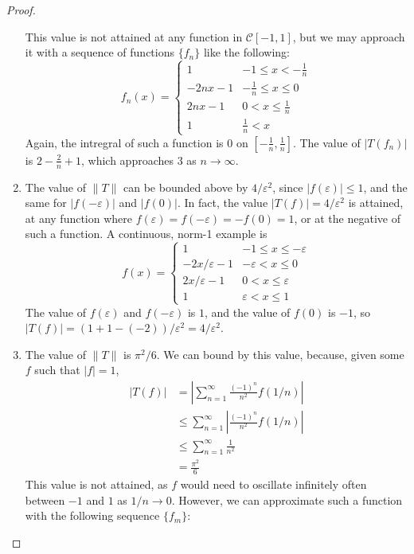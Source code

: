 \documentclass[12pt]{article}
\theoremstyle{definition}
\begin{document}
\begin{proof}
\begin{enumerate}[label=(\roman*)]
        This value is not attained at any function in $\mathcal{C}[-1,1]$, but we may approach it with a sequence of functions $\{f_n\}$ like the following:
        \[
        f_n(x) = \begin{cases}
        1 & -1 \leq x < -\frac{1}{n}\\
        -2nx -1 & -\frac{1}{n} \leq x \leq 0\\
        2nx - 1 & 0 < x \leq \frac{1}{n}\\
        1 & \frac{1}{n} < x
        \end{cases}
        \]
	Again, the intregral of such a function is $0$ on $[-\frac{1}{n}, \frac{1}{n}]$. The value of $\lvert T(f_n) \rvert$ is $2 - \frac{2}{n} + 1$, which approaches $3$ as $n \to \infty$.
        \item The value of $\lVert T \rVert$ can be bounded above by $4/\varepsilon^2$, since $\lvert f(\varepsilon) \rvert \leq 1$, and the same for $\lvert f(-\varepsilon) \rvert$ and $\lvert f(0) \rvert$. In fact, the value $\lvert T(f) \rvert = 4/\varepsilon^2$ is attained, at any function where $f(\varepsilon) = f(-\varepsilon) = -f(0) = 1$, or at the negative of such a function. A continuous, norm-1 example is
        \[
        f(x) = \begin{cases}
        1 & -1 \leq x \leq -\varepsilon\\
        -2x/\varepsilon - 1 & -\varepsilon < x \leq 0\\
        2x/\varepsilon - 1 & 0 < x \leq \varepsilon \\
        1 & \varepsilon < x \leq 1
        \end{cases}
        \]
        The value of $f(\varepsilon)$ and $f(-\varepsilon)$ is $1$, and the value of $f(0)$ is $-1$, so $\lvert T(f) \rvert = (1 + 1 - (-2))/\varepsilon^2 = 4/\varepsilon^2$. 
        \item The value of $\lVert T \rVert$ is $\pi^2/6$. We can bound by this value, because, given some $f$ such that $\lvert f \rvert = 1$,
        \begin{align*}
            \lvert T(f) \rvert &= \left \lvert \sum_{n=1}^\infty \frac{(-1)^n}{n^2} f(1/n)\right \rvert \\
            &\leq \sum_{n = 1}^\infty \left \lvert \frac{(-1)^n}{n^2} f(1/n) \right \rvert \\
            &\leq \sum_{n=1}^\infty \frac{1}{n^2}\\
            &= \frac{\pi^2}{6}
        \end{align*}
        This value is not attained, as $f$ would need to oscillate infinitely often between $-1$ and $1$ as $1/n \to 0$. However, we can approximate such a function with the following sequence $\{f_m\}$:

\end{enumerate}
\end{proof}
\end{document}
